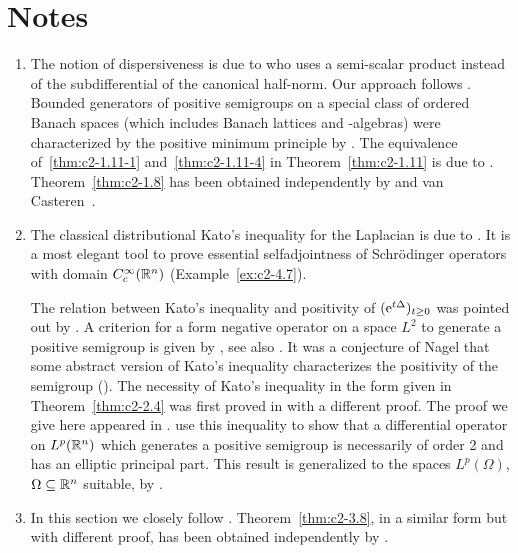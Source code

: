 \section*{Notes}
\begin{enumerate}[label=\emph{Section 2.\arabic*:}, wide]
\item   The notion of dispersiveness is due to \textcite{phillips:1962} who uses a semi-scalar product instead of the subdifferential of the canonical half-norm.
Our approach follows \textcite{arendtchernoffkato:1982}.
Bounded generators of positive semigroups on a special class of ordered Banach spaces (which includes Banach lattices and \CA-algebras) were characterized by the positive minimum principle by \textcite{evanshancheolsen:1979}.
The equivalence of~\ref{thm:c2-1.11-1} and~\ref{thm:c2-1.11-4}  in Theorem~\ref{thm:c2-1.11}  is due to \textcite{nageluhlig:1981}.
Theorem~\ref{thm:c2-1.8}   has been obtained independently by \textcite{arendt:1984a} and van Casteren~\cite{vancasteren:1984}.

\item  
The classical distributional Kato's inequality for the Laplacian is due to \textcite{kato:1973}.
It is a most elegant tool to prove essential selfadjointness of Schrödinger operators with domain $C^{\infty}_{c}(\mathbb{R}^n)$ (\cf Example~\ref{ex:c2-4.7}).

The relation between Kato's inequality and positivity of\/ $(\eu^{t\Delta})_{t \geq 0}$ was pointed out by \textcite{simon:1977}.
A criterion for a form negative operator on a space $L^{2}$ to generate a positive semigroup is given by \textcite{beurlingdeny:1958}, see also \textcite[Vol. IV, Section XIII.12]{reedsimon:1978}.
It was a conjecture of Nagel that some abstract version of
Kato's inequality characterizes the positivity of the semigroup (\cf \textcite{nageluhlig:1981}). The necessity of Kato's inequality in the form given in Theorem~\ref{thm:c2-2.4}   was first proved in \textcite[Remark 3.10]{arendt:1982} with a different proof. 
The proof we give here appeared in \textcite{arendt:1984a}. 
\textcite{miyajimaokazawa:1984} use this inequality to show that a differential operator on $L^p(\mathbb{R}^n)$ which generates a positive semigroup is necessarily of order 2 and has an elliptic principal part. 
This result is generalized to the spaces $L^p(\Omega)$, $\Omega \subseteq \mathbb{R}^n$ suitable, by \textcite{miyajima:1986}.

\item  In this section we closely follow \textcite{arendt:1984a}. Theorem~\ref{thm:c2-3.8}, in a similar form but with different proof, has been obtained independently by \textcite{schep:1985}.


\end{enumerate}
